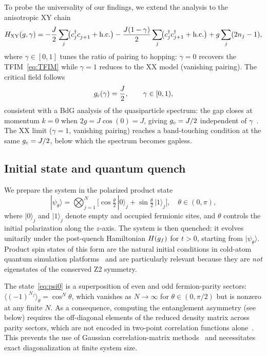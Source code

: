 To probe the universality of our findings, we extend the analysis to the
anisotropic XY chain
\begin{equation}
  H_{\rm XY}(g,\gamma) = -\frac{J}{2}\sum_j\!\bigl(c_j^\dagger c_{j+1}^{\phantom{\dagger}}
  + \mathrm{h.c.}\bigr)
  - \frac{J(1-\gamma)}{2}\sum_j\!\bigl(c_j^\dagger c_{j+1}^\dagger + \mathrm{h.c.}\bigr)
  + g\sum_j(2n_j - 1),
  \label{eq:XY}
\end{equation}
where $\gamma \in [0,1]$ tunes the ratio of pairing to hopping: $\gamma = 0$ recovers the
TFIM~\eqref{eq:TFIM} while $\gamma = 1$ reduces to the XX model (vanishing pairing).
The critical field follows~\cite{Franchini2017}
\begin{equation}
  g_c(\gamma) = \frac{J}{2}, \qquad \gamma \in [0,1),
  \label{eq:gc_XY}
\end{equation}
consistent with a BdG analysis of the quasiparticle spectrum: the gap
closes at momentum $k=0$ when $2g = J\cos(0)=J$, giving $g_c = J/2$
independent of $\gamma$~\cite{Franchini2017,Katsura1962}.
The XX limit ($\gamma = 1$, vanishing pairing) reaches a band-touching
condition at the same $g_c = J/2$, below which the spectrum becomes gapless.

\subsection{Initial state and quantum quench}
\label{sec:quench}

We prepare the system in the polarized product state
\begin{equation}
  |\psi_\theta\rangle = \bigotimes_{j=1}^{N}\!\bigl[\cos\!\tfrac{\theta}{2}\,|0\rangle_j
  + \sin\!\tfrac{\theta}{2}\,|1\rangle_j\bigr], \quad \theta \in (0,\pi),
  \label{eq:psi0}
\end{equation}
where $|0\rangle_j$ and $|1\rangle_j$ denote empty and occupied fermionic sites,
and $\theta$ controls the initial polarization along the $z$-axis.
The system is then quenched: it evolves unitarily under the post-quench Hamiltonian
$H(g_f)$ for $t > 0$, starting from $|\psi_\theta\rangle$.
Product spin states of this form are the natural initial conditions in cold-atom quantum
simulation platforms~\cite{Bloch2008} and are particularly relevant because they are
\emph{not} eigenstates of the conserved Z2 symmetry.

The state~\eqref{eq:psi0} is a superposition of even and odd fermion-parity sectors:
$\langle(-1)^{N_f}\rangle_\theta = \cos^N\theta$, which vanishes as $N\to\infty$ for
$\theta \in (0,\pi/2)$ but is nonzero at any finite $N$.
As a consequence, computing the entanglement asymmetry (see below) requires the
off-diagonal elements of the reduced density matrix across parity sectors, which
are not encoded in two-point correlation functions alone~\cite{Fagotti2008}.
This prevents the use of Gaussian correlation-matrix methods~\cite{Ares2023} and
necessitates exact diagonalization at finite system size.


